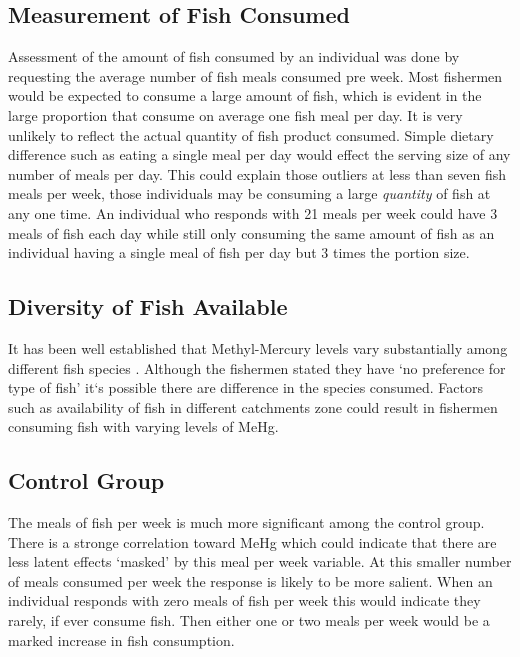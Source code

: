 \documentclass[twocolumn, 12pt]{report}
\begin{document}
\subsection{Measurement of Fish Consumed}

Assessment of the amount of fish consumed by an individual was done by requesting the average number of fish meals consumed pre week. Most fishermen would be expected to consume a large amount of fish, which is evident in the large proportion that consume on average one fish meal per day. It is very unlikely to reflect the actual quantity of fish product  consumed. Simple dietary difference such as eating a single meal per day would effect the serving size of any number of meals per day. This could explain those outliers at less than seven fish meals per week, those individuals may be consuming a large \emph{quantity} of fish at any one time. An individual who responds with 21 meals per week could have 3 meals of fish each day while still only consuming the same amount of fish as an individual having a single meal of fish per day but 3 times the portion size.

\subsection{Diversity of Fish Available}

It has been well established that Methyl-Mercury levels vary substantially among different fish species \cite{al-Majed2000}. Although the fishermen stated they have `no preference for type of fish' \cite{al2000factors} it`s possible there are difference in the species consumed. Factors such as availability of fish in different catchments zone could result in fishermen consuming fish with varying levels of MeHg.  

\subsection{Control Group}

The meals of fish per week is much more significant among the control group. There is a stronge correlation toward MeHg which could indicate that there are less latent effects `masked' by this meal per week variable. At this smaller number of meals consumed per week the response is likely to be more salient. When an individual responds with zero meals of fish per week this would indicate they rarely, if ever consume fish. Then either one or two meals per week would be a marked increase in fish consumption.
\end{document}
